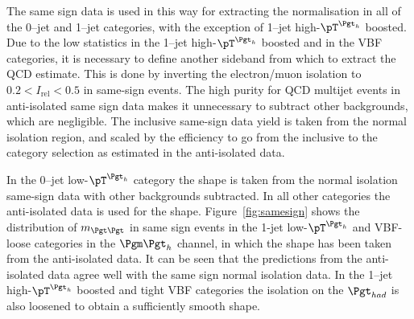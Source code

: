 The same sign data is used in this way for extracting the normalisation in all of the
0--jet and 1--jet
categories, with the exception of 1--jet high-$\pT^{\Pgth}$ boosted.
Due to the low statistics in the 1--jet high-$\pT^{\Pgth}$ boosted and in the VBF
categories, it is necessary to define another
sideband from which to extract the QCD estimate. This is done by inverting the
electron/muon isolation to $0.2 < I_{\text{rel}} < 0.5$ in same-sign events. 
The high purity for QCD multijet events in anti-isolated same sign data makes 
it unnecessary to subtract other backgrounds, which are negligible. 
The inclusive same-sign data yield is taken from the normal 
isolation region, and scaled by the efficiency to go from the inclusive to the 
category selection as estimated in the anti-isolated data. 

In the 0--jet low-$\pT^{\Pgth}$ category the shape is taken from the normal
isolation same-sign data with other backgrounds subtracted. In all other
categories the anti-isolated data is used for the shape.
Figure~\ref{fig:samesign} shows the distribution of $m_{\Pgt\Pgt}$ in same sign
events in the 1-jet low-$\pT^{\Pgth}$ and VBF-loose categories in the $\mutau$
channel, in which the shape has been taken from the anti-isolated data. It can be seen that the
predictions from the anti-isolated data agree well with the same sign normal
isolation data. In the 1--jet
high-$\pT^{\Pgth}$ boosted and tight VBF categories the isolation on the
$\Pgt_{had}$ is also loosened to obtain a sufficiently smooth shape. 

